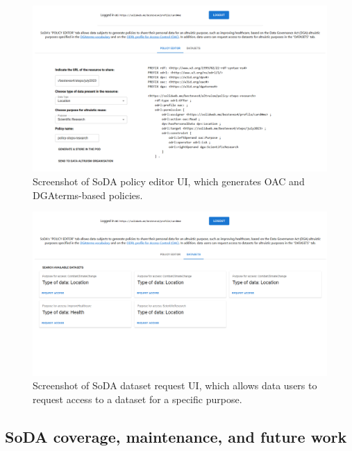 \begin{figure}[ht]
    \centering
    \includegraphics[width=\linewidth]{figures/chapter-7/policy-editor.png}
    \caption{Screenshot of SoDA policy editor UI, which generates OAC and DGAterms-based policies.}
    \label{fig:soda-ds}
\end{figure}

\begin{figure}[ht]
    \centering
    \includegraphics[width=\linewidth]{figures/chapter-7/datasets.png}
    \caption{Screenshot of SoDA dataset request UI, which allows data users to request access to a dataset for a specific purpose.}
    \label{fig:soda-du}
\end{figure}

\subsection{SoDA coverage, maintenance, and future work}
\label{sec:maintenance_soda}

